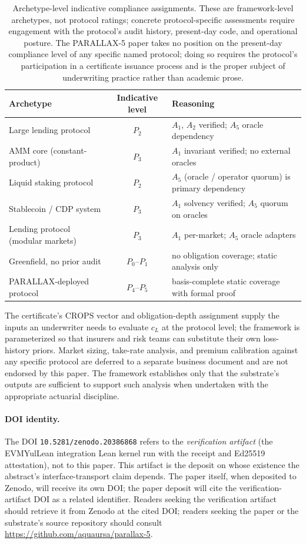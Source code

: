 \documentclass[11pt,a4paper]{article}
\begin{document}
\begin{table}[h]
\centering
\small
\begin{tabular}{p{4.5cm}cp{6.5cm}}
\toprule
Archetype & Indicative level & Reasoning \\
\midrule
Large lending protocol & $P_2$ & $A_1$, $A_2$ verified; $A_5$ oracle dependency \\
AMM core (constant-product) & $P_3$ & $A_1$ invariant verified; no external oracles \\
Liquid staking protocol & $P_2$ & $A_5$ (oracle / operator quorum) is primary dependency \\
Stablecoin / CDP system & $P_3$ & $A_1$ solvency verified; $A_5$ quorum on oracles \\
Lending protocol (modular markets) & $P_3$ & $A_1$ per-market; $A_5$ oracle adapters \\
Greenfield, no prior audit & $P_0$--$P_1$ & no obligation coverage; static analysis only \\
PARALLAX-deployed protocol & $P_4$--$P_5$ & basis-complete static coverage with formal proof \\
\bottomrule
\end{tabular}
\caption{Archetype-level indicative compliance assignments. These are framework-level archetypes, not protocol ratings; concrete protocol-specific assessments require engagement with the protocol's audit history, present-day code, and operational posture. The PARALLAX-5 paper takes no position on the present-day compliance level of any specific named protocol; doing so requires the protocol's participation in a certificate issuance process and is the proper subject of underwriting practice rather than academic prose.}\label{tab:risk-archetypes}
\end{table}

The certificate's $\mathrm{CROPS}$ vector and obligation-depth assignment supply the inputs an underwriter needs to evaluate $c_L$ at the protocol level; the framework is parameterized so that insurers and risk teams can substitute their own loss-history priors. Market sizing, take-rate analysis, and premium calibration against any specific protocol are deferred to a separate business document and are not endorsed by this paper. The framework establishes only that the substrate's outputs are sufficient to support such analysis when undertaken with the appropriate actuarial discipline.


\paragraph{DOI identity.} The DOI \texttt{10.5281/zenodo.20386868} refers to the \emph{verification artifact} (the EVMYulLean integration Lean kernel run with the receipt and Ed25519 attestation), not to this paper. This artifact is the deposit on whose existence the abstract's interface-transport claim depends. The paper itself, when deposited to Zenodo, will receive its own DOI; the paper deposit will cite the verification-artifact DOI as a related identifier. Readers seeking the verification artifact should retrieve it from Zenodo at the cited DOI; readers seeking the paper or the substrate's source repository should consult \url{https://github.com/aquaursa/parallax-5}.
\end{document}
